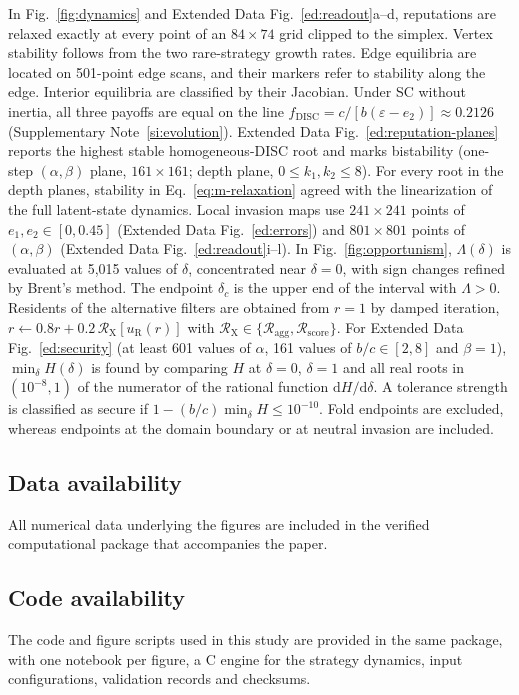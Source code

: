 \documentclass[10pt]{wlscirep}
\newif\ifdraftnotes
\DeclareRobustCommand{\draftnote}[1]{%
  \ifdraftnotes{\color{red!60!black}\sffamily\footnotesize[#1]}\fi}
\newcommand{\Rmap}{\mathscr{R}}            %
\newcommand{\dd}{\mathrm{d}}
\newcommand{\DISC}{\mathrm{DISC}}
\theoremstyle{plain}
\theoremstyle{remark}
\begin{document}
In Fig.~\ref{fig:dynamics} and Extended Data Fig.~\ref{ed:readout}a--d, reputations are relaxed exactly at every point of an $84\times74$ grid clipped to the simplex. Vertex stability follows from the two rare-strategy growth rates. Edge equilibria are located on 501-point edge scans, and their markers refer to stability along the edge. Interior equilibria are classified by their Jacobian. Under SC without inertia, all three payoffs are equal on the line $f_{\DISC}=c/[b(\varepsilon-e_2)]\approx0.2126$ (Supplementary Note~\ref{si:evolution}). Extended Data Fig.~\ref{ed:reputation-planes} reports the highest stable homogeneous-DISC root and marks bistability (one-step $(\alpha,\beta)$ plane, $161\times161$; depth plane, $0\leq k_1,k_2\leq8$). For every root in the depth planes, stability in Eq.~\eqref{eq:m-relaxation} agreed with the linearization of the full latent-state dynamics. Local invasion maps use $241\times241$ points of $e_1,e_2\in[0,0.45]$ (Extended Data Fig.~\ref{ed:errors}) and $801\times801$ points of $(\alpha,\beta)$ (Extended Data Fig.~\ref{ed:readout}i--l). In Fig.~\ref{fig:opportunism}, $\Lambda(\delta)$ is evaluated at 5,015 values of $\delta$, concentrated near $\delta=0$, with sign changes refined by Brent's method. The endpoint $\delta_c$ is the upper end of the interval with $\Lambda>0$. Residents of the alternative filters are obtained from $r=1$ by damped iteration, $r\leftarrow0.8r+0.2\,\Rmap_{\mathrm X}[u_{\mathrm R}(r)]$ with $\Rmap_{\mathrm X}\in\{\Rmap_{\mathrm{agg}},\Rmap_{\mathrm{score}}\}$. For Extended Data Fig.~\ref{ed:security} (at least 601 values of $\alpha$, 161 values of $b/c\in[2,8]$ and $\beta=1$), $\min_\delta H(\delta)$ is found by comparing $H$ at $\delta=0$, $\delta=1$ and all real roots in $(10^{-8},1)$ of the numerator of the rational function $\dd H/\dd\delta$. A tolerance strength is classified as secure if $1-(b/c)\min_\delta H\leq10^{-10}$. Fold endpoints are excluded, whereas endpoints at the domain boundary or at neutral invasion are included.

\subsection*{Data availability}
All numerical data underlying the figures are included in the verified computational package that accompanies the paper. \draftnote{Repository and DOI to be added before submission.}

\subsection*{Code availability}
The code and figure scripts used in this study are provided in the same package, with one notebook per figure, a C engine for the strategy dynamics, input configurations, validation records and checksums. \draftnote{Repository and DOI to be added before submission.}
\end{document}
